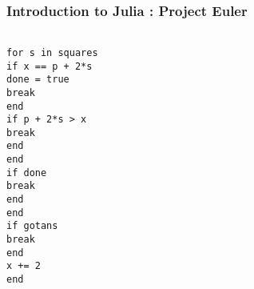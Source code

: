 
\begin{frame}[fragile]

\frametitle{Introduction to Julia : Project Euler}

\begin{verbatim}

for s in squares
if x == p + 2*s
done = true
break
end
if p + 2*s > x
break
end
end
if done
break
end
end
if gotans
break
end
x += 2
end

\end{verbatim}

\end{frame}



